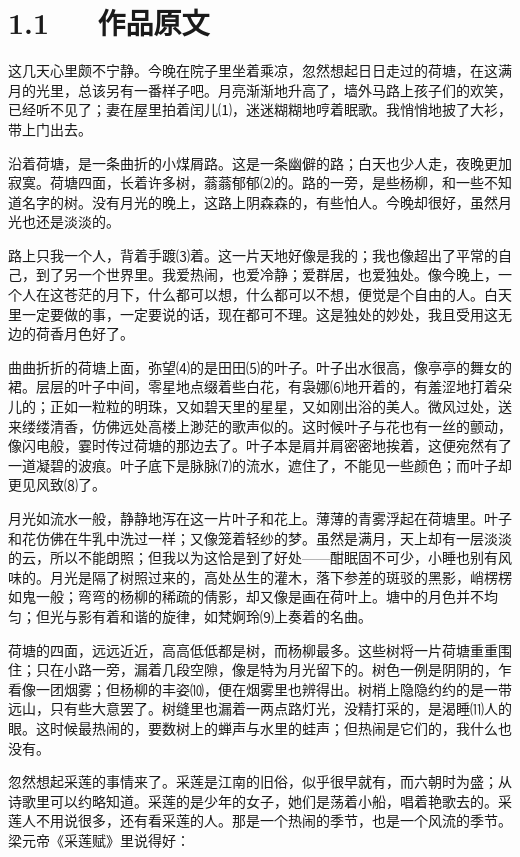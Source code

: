\documentclass[letterpaper,12pt,english]{sphinxmanual}
\begin{document}
\section{1.1   作品原文}
\label{\detokenize{p01_u6563_u6587/_u6731_u81ea_u6e05-_u8377_u5858_u6708_u8272:id3}}
这几天心里颇不宁静。今晚在院子里坐着乘凉，忽然想起日日走过的荷塘，在这满月的光里，总该另有一番样子吧。月亮渐渐地升高了，墙外马路上孩子们的欢笑，已经听不见了；妻在屋里拍着闰儿⑴，迷迷糊糊地哼着眠歌。我悄悄地披了大衫，带上门出去。

沿着荷塘，是一条曲折的小煤屑路。这是一条幽僻的路；白天也少人走，夜晚更加寂寞。荷塘四面，长着许多树，蓊蓊郁郁⑵的。路的一旁，是些杨柳，和一些不知道名字的树。没有月光的晚上，这路上阴森森的，有些怕人。今晚却很好，虽然月光也还是淡淡的。

路上只我一个人，背着手踱⑶着。这一片天地好像是我的；我也像超出了平常的自己，到了另一个世界里。我爱热闹，也爱冷静；爱群居，也爱独处。像今晚上，一个人在这苍茫的月下，什么都可以想，什么都可以不想，便觉是个自由的人。白天里一定要做的事，一定要说的话，现在都可不理。这是独处的妙处，我且受用这无边的荷香月色好了。

曲曲折折的荷塘上面，弥望⑷的是田田⑸的叶子。叶子出水很高，像亭亭的舞女的裙。层层的叶子中间，零星地点缀着些白花，有袅娜⑹地开着的，有羞涩地打着朵儿的；正如一粒粒的明珠，又如碧天里的星星，又如刚出浴的美人。微风过处，送来缕缕清香，仿佛远处高楼上渺茫的歌声似的。这时候叶子与花也有一丝的颤动，像闪电般，霎时传过荷塘的那边去了。叶子本是肩并肩密密地挨着，这便宛然有了一道凝碧的波痕。叶子底下是脉脉⑺的流水，遮住了，不能见一些颜色；而叶子却更见风致⑻了。

月光如流水一般，静静地泻在这一片叶子和花上。薄薄的青雾浮起在荷塘里。叶子和花仿佛在牛乳中洗过一样；又像笼着轻纱的梦。虽然是满月，天上却有一层淡淡的云，所以不能朗照；但我以为这恰是到了好处——酣眠固不可少，小睡也别有风味的。月光是隔了树照过来的，高处丛生的灌木，落下参差的斑驳的黑影，峭楞楞如鬼一般；弯弯的杨柳的稀疏的倩影，却又像是画在荷叶上。塘中的月色并不均匀；但光与影有着和谐的旋律，如梵婀玲⑼上奏着的名曲。

荷塘的四面，远远近近，高高低低都是树，而杨柳最多。这些树将一片荷塘重重围住；只在小路一旁，漏着几段空隙，像是特为月光留下的。树色一例是阴阴的，乍看像一团烟雾；但杨柳的丰姿⑽，便在烟雾里也辨得出。树梢上隐隐约约的是一带远山，只有些大意罢了。树缝里也漏着一两点路灯光，没精打采的，是渴睡⑾人的眼。这时候最热闹的，要数树上的蝉声与水里的蛙声；但热闹是它们的，我什么也没有。

忽然想起采莲的事情来了。采莲是江南的旧俗，似乎很早就有，而六朝时为盛；从诗歌里可以约略知道。采莲的是少年的女子，她们是荡着小船，唱着艳歌去的。采莲人不用说很多，还有看采莲的人。那是一个热闹的季节，也是一个风流的季节。梁元帝《采莲赋》里说得好：
\end{document}
